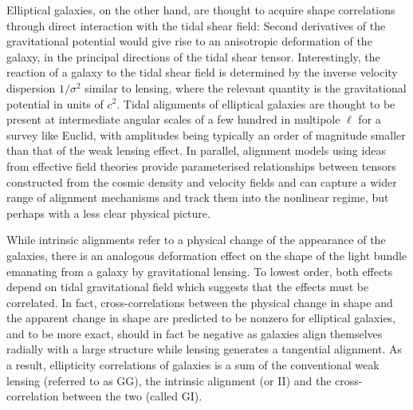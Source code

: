 \documentclass[a4paper,fleqn,usenatbib]{mnras}
\begin{document}
Elliptical galaxies, on the other hand, are thought to acquire shape correlations through direct interaction with the tidal shear field: Second derivatives of the gravitational potential would give rise to an anisotropic deformation of the galaxy, in the principal directions of the tidal shear tensor. Interestingly, the reaction of a galaxy to the tidal shear field is determined by the inverse velocity dispersion $1/\sigma^2$ similar to lensing, where the relevant quantity is the gravitational potential in units of $c^2$. Tidal alignments of elliptical galaxies are thought to be present at intermediate angular scales of a few hundred in multipole $\ell$ for a survey like Euclid, with amplitudes being typically an order of magnitude smaller than that of the weak lensing effect. In parallel, alignment models using ideas from effective field theories provide parameterised relationships between tensors constructed from the cosmic density and velocity fields and can capture a wider range of alignment mechanisms and track them into the nonlinear regime, but perhaps with a less clear physical picture. 

While intrinsic alignments refer to a physical change of the appearance of the galaxies, there is an analogous deformation effect on the shape of the light bundle emanating from a galaxy by gravitational lensing. To lowest order, both effects depend on tidal gravitational field which suggests that the effects must be correlated. In fact, cross-correlations between the physical change in shape and the apparent change in shape are predicted to be nonzero for elliptical galaxies, and to be more exact, should in fact be negative as galaxies align themselves radially with a large structure while lensing generates a tangential alignment. As a result, ellipticity correlations of galaxies is a sum of the conventional weak lensing (referred to as GG), the intrinsic alignment (or II) and the cross-correlation between the two (called GI).
\end{document}
